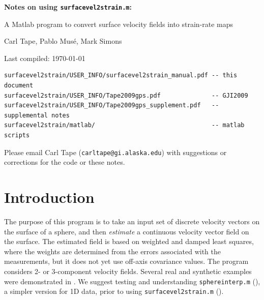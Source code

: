 \documentclass[11pt,titlepage,fleqn]{article}
\begin{document}

\begin{spacing}{1.5}
\begin{center}
{\large \bf Notes on using {\tt surfacevel2strain.m}:

A Matlab program to convert surface velocity fields into strain-rate maps}
\end{center}
\end{spacing}

\bigskip
\noindent Carl Tape, Pablo Mus\'e, Mark Simons

\noindent Last compiled: \today

\small

\begin{verbatim}
surfacevel2strain/USER_INFO/surfacevel2strain_manual.pdf -- this document
surfacevel2strain/USER_INFO/Tape2009gps.pdf              -- GJI2009 
surfacevel2strain/USER_INFO/Tape2009gps_supplement.pdf   -- supplemental notes
surfacevel2strain/matlab/                                -- matlab scripts
\end{verbatim}

\noindent
Please email Carl Tape ({\tt carltape@gi.alaska.edu}) with suggestions or corrections for the code or these notes.

\tableofcontents


\section{Introduction}

The purpose of this program is to take an input set of discrete velocity vectors on the surface of a sphere, and then {\em estimate} a continuous velocity vector field on the surface. The estimated field is based on weighted and damped least squares, where the weights are determined from the errors associated with the measurements, but it does not yet use off-axis covariance values.  The program considers 2- or 3-component velocity fields. Several real and synthetic examples were demonstrated in \citet{Tape2009gps}. We suggest testing and understanding \verb+sphereinterp.m+ (), a simpler version for 1D data, prior to using \verb+surfacevel2strain.m+ ().

\end{document}
